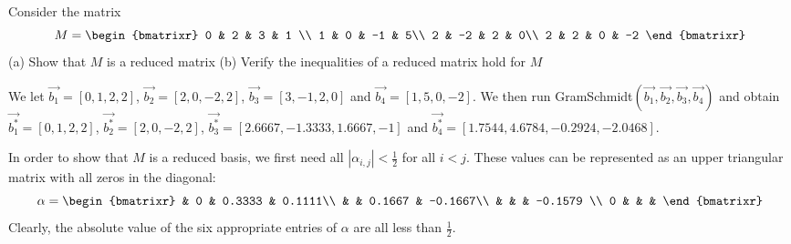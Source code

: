 \documentclass[11pt]{article}
\begin{document}
\begin{prob}{8.6}
  Consider the matrix
  \begin{equation*}
    M=\begin{bmatrixr}{4}
    0 & 2 & 3 & 1 \\
    1 & 0 & -1 & 5\\
    2 & -2 & 2 & 0\\
    2 & 2 & 0 & -2
    \end{bmatrixr}
  \end{equation*}
  (a) Show that $M$ is a reduced matrix (b) Verify the inequalities of a reduced matrix hold for $M$
\end{prob}
\begin{sol} We let $\vec{b_1}=[0,1,2,2]$, $\vec{b_2}=[2,0,-2,2]$, $\vec{b_3}=[3,-1,2,0]$ and $\vec{b_4}=[1,5,0,-2]$. We then run {\sc GramSchmidt}$(\vec{b_1},\vec{b_2},\vec{b_3},\vec{b_4})$ and obtain $\vec{b_1^*}=[0,1,2,2]$, $\vec{b_2^*}=[2,0,-2,2]$, $\vec{b_3^*}=[2.6667,-1.3333,1.6667,-1]$ and $\vec{b_4^*}=[1.7544,4.6784,-0.2924,-2.0468]$.
  \begin{enumalph}
    \item In order to show that $M$ is a reduced basis, we first need all $|\alpha_{i,j}|<\tfrac{1}{2}$ for all $i<j$. These values can be represented as an upper triangular matrix with all zeros in the diagonal:
      \begin{equation*}
        \alpha = \begin{bmatrixr}{4}
          & 0 & 0.3333 & 0.1111\\
          & & 0.1667 & -0.1667\\
          & & & -0.1579 \\
          0 & & &
        \end{bmatrixr}
      \end{equation*}
      Clearly, the absolute value of the six appropriate entries of $\alpha$ are all less than $\tfrac{1}{2}$.
    

\end{enumalph}
\end{sol}
\end{document}

